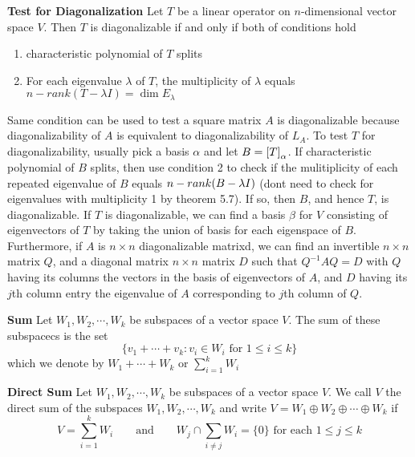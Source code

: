 \documentclass[11pt]{article}
\begin{document}
\begin{defn*}
    \textbf{Test for Diagonalization} Let $T$ be a linear operator on $n$-dimensional vector space $V$. Then $T$ is diagonalizable if and only if both of conditions hold 
    \begin{enumerate}
        \item characteristic polynomial of $T$ splits 
        \item For each eigenvalue $\lambda$ of $T$, the multiplicity of $\lambda$ equals $n-rank(T-\lambda I) = \dim{E_{\lambda}}$
    \end{enumerate}
    Same condition can be used to test a square matrix $A$ is diagonalizable because diagonalizability of $A$ is equivalent to diagonalizability of $L_A$. To test $T$ for diagonalizability, usually pick a basis $\alpha$ and let $B=\left[ T \right]_{\alpha}$. If characteristic polynomial of $B$ splits, then use condition 2 to check if the mulitiplicity of each repeated eigenvalue of $B$ equals $n-rank(B-\lambda I)$ (dont need to check for eigenvalues with multiplicity 1 by theorem 5.7). If so, then $B$, and hence $T$, is diagonalizable. If $T$ is diagonalizable, we can find a basis $\beta$ for $V$ consisting of eigenvectors of $T$ by taking the union of basis for each eigenspace of $B$. Furthermore, if $A$ is $n\times n$ diagonalizable matrixd, we can find an invertible $n\times n$ matrix $Q$, and a diagonal matrix $n\times n$ matrix $D$ such that $Q^{-1}AQ=D$ with $Q$ having its columns the vectors in the basis of eigenvectors of $A$, and $D$ having its $j$th column entry the eigenvalue of $A$ corresponding to $j$th column of $Q$.
\end{defn*}





\begin{defn*}
    \textbf{Sum} Let $W_1, W_2,\cdots, W_k$ be subspaces of a vector space $V$. The sum of these subspacecs is the set 
    \[
        \{v_1 + \cdots + v_k : v_i \in W_i \text{ for } 1 \leq i \leq k\}    
    \]
    which we denote by $W_1 + \cdots + W_k$ or $\textstyle\sum_{i=1}^k W_i$
\end{defn*}

\begin{defn*}
    \textbf{Direct Sum} Let $W_1, W_2, \cdots, W_k$ be subspaces of a vector space $V$. We call $V$ the direct sum of the subspaces $W_1, W_2, \cdots, W_k$ and write $V = W_1 \oplus W_2 \oplus \cdots \oplus W_k$ if 
    \[
        V = \sum_{i=1}^k W_i    
        \qquad \text{and} \qquad 
        W_j \cap \sum_{i\neq j} W_i = \{ 0\} \text{ for each } 1 \leq j \leq k
    \]
\end{defn*}
\end{document}
